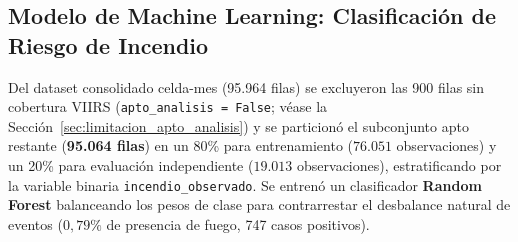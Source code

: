 \documentclass[11pt,a4paper]{article}
\begin{document}
\begin{table}[H]
\centering
\caption{Resultados de la canalizaci\'on de agregaci\'on en MongoDB (\texttt{evidencia\_viirs\_celda\_mes}).}
\label{tab:mongo_resultado}
\end{table}

\subsection{Modelo de Machine Learning: Clasificaci\'on de Riesgo de Incendio}
Del dataset consolidado celda-mes (95.964 filas) se excluyeron las 900 filas sin cobertura VIIRS (\texttt{apto\_analisis = False}; v\'ease la Secci\'on~\ref{sec:limitacion_apto_analisis}) y se particion\'o el subconjunto apto restante (\textbf{95.064 filas}) en un 80\% para entrenamiento ($76.051$ observaciones) y un 20\% para evaluaci\'on independiente ($19.013$ observaciones), estratificando por la variable binaria \texttt{incendio\_observado}. Se entren\'o un clasificador \textbf{Random Forest} balanceando los pesos de clase para contrarrestar el desbalance natural de eventos ($0{,}79\%$ de presencia de fuego, 747 casos positivos).
\end{document}
